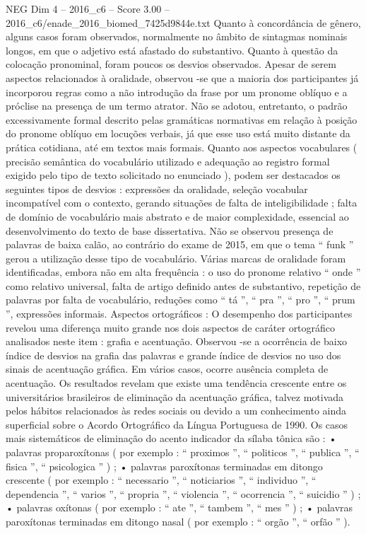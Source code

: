 \begin{textsample}{NEG Dim 4 – 2016\_c6 – Score 3.00 – 2016\_c6/enade\_2016\_biomed\_7425d9844e.txt}
Quanto à concordância de gênero, alguns casos foram observados, normalmente no âmbito de sintagmas nominais longos, em que o adjetivo está afastado do substantivo.
Quanto à questão da colocação pronominal, foram poucos os desvios observados.
Apesar de serem aspectos relacionados à oralidade, observou -se que a maioria dos participantes já incorporou regras como a não introdução da frase por um pronome oblíquo e a próclise na presença de um termo atrator.
Não se adotou, entretanto, o padrão excessivamente formal descrito pelas gramáticas normativas em relação à posição do pronome oblíquo em locuções verbais, já que esse uso está muito distante da prática cotidiana, até em textos mais formais.
Quanto aos aspectos vocabulares ( precisão semântica do vocabulário utilizado e adequação ao registro formal exigido pelo tipo de texto solicitado no enunciado ), podem ser destacados os seguintes tipos de desvios : expressões da oralidade, seleção vocabular incompatível com o contexto, gerando situações de falta de inteligibilidade ; falta de domínio de vocabulário mais abstrato e de maior complexidade, essencial ao desenvolvimento do texto de base dissertativa.
Não se observou presença de palavras de baixa calão, ao contrário do exame de 2015, em que o tema “ funk ” gerou a utilização desse tipo de vocabulário.
Várias marcas de oralidade foram identificadas, embora não em alta frequência : o uso do pronome relativo “ onde ” como relativo universal, falta de artigo definido antes de substantivo, repetição de palavras por falta de vocabulário, reduções como “ tá ”, “ pra ”, “ pro ”, “ prum ”, expressões informais.
Aspectos ortográficos : O desempenho dos participantes revelou uma diferença muito grande nos dois aspectos de caráter ortográfico analisados neste item : grafia e acentuação.
Observou -se a ocorrência de baixo índice de desvios na grafia das palavras e grande índice de desvios no uso dos sinais de acentuação gráfica.
Em vários casos, ocorre ausência completa de acentuação.
Os resultados revelam que existe uma tendência crescente entre os universitários brasileiros de eliminação da acentuação gráfica, talvez motivada pelos hábitos relacionados às redes sociais ou devido a um conhecimento ainda superficial sobre o Acordo Ortográfico da Língua Portuguesa de 1990.
Os casos mais sistemáticos de eliminação do acento indicador da sílaba tônica são : • palavras proparoxítonas ( por exemplo : “ proximos ”, “ politicos ”, “ publica ”, “ fisica ”, “ psicologica ” ) ; • palavras paroxítonas terminadas em ditongo crescente ( por exemplo : “ necessario ”, “ noticiarios ”, “ individuo ”, “ dependencia ”, “ varios ”, “ propria ”, “ violencia ”, “ ocorrencia ”, “ suicidio ” ) ; • palavras oxítonas ( por exemplo : “ ate ”, “ tambem ”, “ mes ” ) ; • palavras paroxítonas terminadas em ditongo nasal ( por exemplo : “ orgão ”, “ orfão ” ).

\end{textsample}
